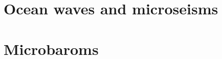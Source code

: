 \documentclass[a4paper]{book}  %
\begin{document}
\chapter{Ocean waves and microseisms}\label{chsismo}

\cleardoublepage
\chapter{Microbaroms}\label{chbaroms}

% 
%
%
%



\end{document}
